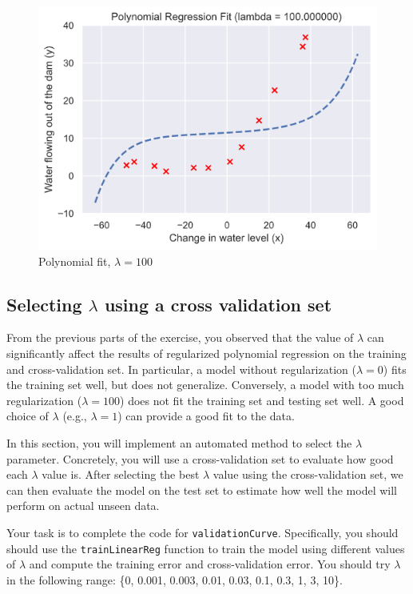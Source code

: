 \documentclass[12pt]{article}
\begin{document}
\begin{figure}[h!]
  \centering
  \includegraphics[scale=0.6]{polyfit100.png}
  \caption{Polynomial fit, $\lambda = 100$}
  \label{fig:polyfit100}
\end{figure}

\subsection{Selecting $\lambda$ using a cross validation set}

From the previous parts of the exercise, you observed that the value of $\lambda$ can significantly affect the results of regularized polynomial regression on the training and cross-validation set. In particular, a model without regularization ($\lambda = 0$) fits the training set well, but does not generalize. Conversely, a model with too much regularization ($\lambda = 100$) does not fit the training set and testing set well. A good choice of $\lambda$ (e.g., $\lambda = 1$) can provide a good fit to the data.

In this section, you will implement an automated method to select the $\lambda$ parameter. Concretely, you will use a cross-validation set to evaluate how good each $\lambda$ value is. After selecting the best $\lambda$ value using the cross-validation set, we can then evaluate the model on the test set to estimate how well the model will perform on actual unseen data.

Your task is to complete the code for \texttt{validationCurve}. Specifically, you should should use the \texttt{trainLinearReg} function to train the model using different values of $\lambda$ and compute the training error and cross-validation error. You should try $\lambda$ in the following range: \{0, 0.001, 0.003, 0.01, 0.03, 0.1, 0.3, 1, 3, 10\}.
\end{document}
